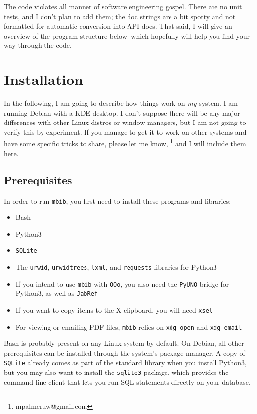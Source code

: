 \documentclass[10pt]{article}
\newcommand*{\mbib}{\texttt{mbib}\xspace}
\newcommand*{\jabref}{\texttt{JabRef}\xspace}
\newcommand*{\ooo}{\texttt{OOo}\xspace}
\newcommand*{\sqlite}{\texttt{SQLite}\xspace}
\begin{document}
The code violates all manner of software engineering gospel. There are no unit tests, and I don't plan to add them; the doc strings are a bit spotty and not formatted for automatic conversion into API docs. That said, I will give an overview of the program structure below, which hopefully will help you find your way through the code. 

\section{Installation}

In the following, I am going to describe how things work on \emph{my} system. I am running Debian with a KDE desktop. I don't suppose there will be any major differences with other Linux distros or window managers, but I am not going to verify this by experiment. If you manage to get it to work on other systems and have some specific tricks to share, please let me know,%
%
\footnote{mpalmeruw@gmail.com}
%
and I will include them here.

\subsection{Prerequisites}

In order to run \mbib, you first need to install these programs and libraries:

\begin{itemize}
\item Bash
\item Python3 
\item \sqlite
\item The \texttt{urwid}, \texttt{urwidtrees}, \texttt{lxml}, and \texttt{requests} libraries for Python3
\item If you intend to use \mbib with \ooo, you also need the \texttt{PyUNO} bridge for Python3, as well as \jabref
\item If you want to copy items to the X clipboard, you will need \texttt{xsel}
\item For viewing or emailing PDF files, \mbib relies on \texttt{xdg-open} and \texttt{xdg-email}
\end{itemize}

\noindent Bash is probably present on any Linux system by default. On Debian, all other prerequisites can be installed through the system's package manager. A copy of \sqlite already comes as part of the standard library when you install Python3, but you may also want to install the \texttt{sqlite3} package, which provides the command line client that lets you run SQL statements directly on your database. 
\end{document}
